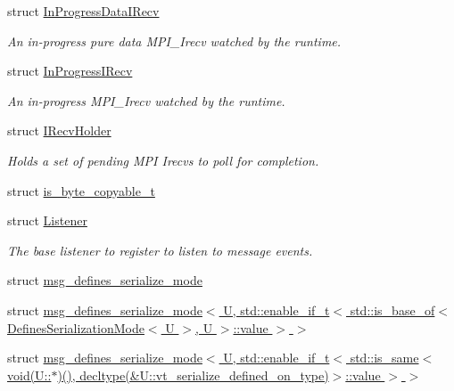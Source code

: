 \begin{DoxyCompactItemize}
\item 
struct \hyperlink{structvt_1_1messaging_1_1_in_progress_data_i_recv}{In\+Progress\+Data\+I\+Recv}
\begin{DoxyCompactList}\small\item\em An in-\/progress pure data M\+P\+I\+\_\+\+Irecv watched by the runtime. \end{DoxyCompactList}\item 
struct \hyperlink{structvt_1_1messaging_1_1_in_progress_i_recv}{In\+Progress\+I\+Recv}
\begin{DoxyCompactList}\small\item\em An in-\/progress M\+P\+I\+\_\+\+Irecv watched by the runtime. \end{DoxyCompactList}\item 
struct \hyperlink{structvt_1_1messaging_1_1_i_recv_holder}{I\+Recv\+Holder}
\begin{DoxyCompactList}\small\item\em Holds a set of pending M\+PI Irecvs to poll for completion. \end{DoxyCompactList}\item 
struct \hyperlink{structvt_1_1messaging_1_1is__byte__copyable__t}{is\+\_\+byte\+\_\+copyable\+\_\+t}
\item 
struct \hyperlink{structvt_1_1messaging_1_1_listener}{Listener}
\begin{DoxyCompactList}\small\item\em The base listener to register to listen to message events. \end{DoxyCompactList}\item 
struct \hyperlink{structvt_1_1messaging_1_1msg__defines__serialize__mode}{msg\+\_\+defines\+\_\+serialize\+\_\+mode}
\item 
struct \hyperlink{structvt_1_1messaging_1_1msg__defines__serialize__mode_3_01_u_00_01std_1_1enable__if__t_3_01std_8698c5f7a65cc513c46123d196b4add1}{msg\+\_\+defines\+\_\+serialize\+\_\+mode$<$ U, std\+::enable\+\_\+if\+\_\+t$<$ std\+::is\+\_\+base\+\_\+of$<$ Defines\+Serialization\+Mode$<$ U $>$, U $>$\+::value $>$ $>$}
\item 
struct \hyperlink{structvt_1_1messaging_1_1msg__defines__serialize__mode_3_01_u_00_01std_1_1enable__if__t_3_01std_9ff39ec7a2238fd9d7cc614da26fbe04}{msg\+\_\+defines\+\_\+serialize\+\_\+mode$<$ U, std\+::enable\+\_\+if\+\_\+t$<$ std\+::is\+\_\+same$<$ void(\+U\+::$\ast$)(), decltype(\&\+U\+::vt\+\_\+serialize\+\_\+defined\+\_\+on\+\_\+type)$>$\+::value $>$ $>$}
\item 

\end{DoxyCompactItemize}
